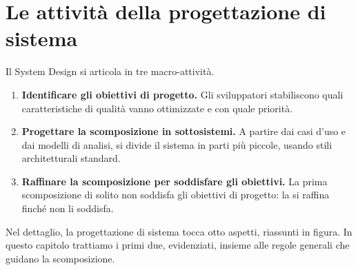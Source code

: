 \begin{center}
\end{center}

\section{Le attività della progettazione di sistema}

Il System Design si articola in tre macro-attività.
\begin{enumerate}
  \item \textbf{Identificare gli obiettivi di progetto.} Gli sviluppatori stabiliscono quali caratteristiche di qualità vanno
        ottimizzate e con quale priorità.
  \item \textbf{Progettare la scomposizione in sottosistemi.} A partire dai casi d'uso e dai modelli di analisi, si divide
        il sistema in parti più piccole, usando stili architetturali standard.
  \item \textbf{Raffinare la scomposizione per soddisfare gli obiettivi.} La prima scomposizione di solito non soddisfa gli
        obiettivi di progetto: la si raffina finché non li soddisfa.
\end{enumerate}

Nel dettaglio, la progettazione di sistema tocca otto aspetti, riassunti in figura. In questo capitolo trattiamo i primi
due, evidenziati, insieme alle regole generali che guidano la scomposizione.

